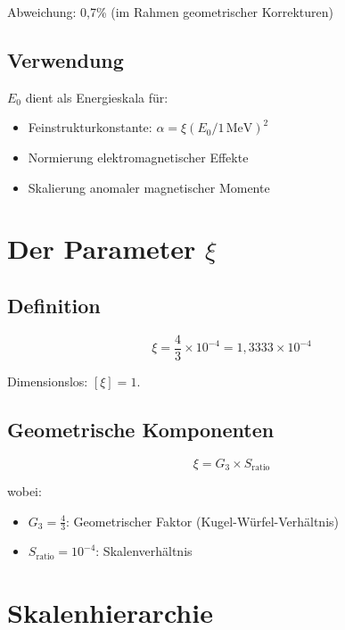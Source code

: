 	Abweichung: 0,7\% (im Rahmen geometrischer Korrekturen)
	
	\subsection{Verwendung}
	
	$E_0$ dient als Energieskala für:
	\begin{itemize}
		\item Feinstrukturkonstante: $\alpha = \xi (E_0/1\,\text{MeV})^2$
		\item Normierung elektromagnetischer Effekte
		\item Skalierung anomaler magnetischer Momente
	\end{itemize}
	
	\section{Der Parameter $\xi$}
	\label{sec:xi_parameter}
	
	\subsection{Definition}
	
	\begin{equation}
		\boxed{\xi = \frac{4}{3} \times 10^{-4} = 1{,}3333 \times 10^{-4}}
	\end{equation}
	
	Dimensionslos: $[\xi] = 1$.
	
	\subsection{Geometrische Komponenten}
	
	\begin{equation}
		\xi = G_3 \times S_{\text{ratio}}
	\end{equation}
	
	wobei:
	\begin{itemize}
		\item $G_3 = \frac{4}{3}$: Geometrischer Faktor (Kugel-Würfel-Verhältnis)
		\item $S_{\text{ratio}} = 10^{-4}$: Skalenverhältnis
	\end{itemize}
	
	\section{Skalenhierarchie}
	\label{sec:scale_hierarchy}
	
